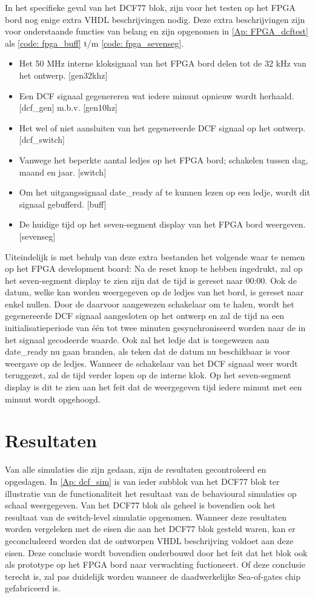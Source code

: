 \noindent In het specifieke geval van het DCF77 blok, zijn voor het testen op het FPGA bord nog enige extra VHDL beschrijvingen nodig. Deze extra beschrijvingen zijn voor onderstaande functies van belang en zijn opgenomen in \cref{Ap: FPGA_dcftest} als \cref{code: fpga_buff} t/m \cref{code: fpga_sevenseg}.
\begin{itemize}[nolistsep]
\item Het 50 MHz interne kloksignaal van het FPGA bord delen tot de 32 kHz van het ontwerp. [gen32khz]
\item Een DCF signaal gegenereren wat iedere minuut opnieuw wordt herhaald. [dcf\_gen] m.b.v. [gen10hz]
\item Het wel of niet aansluiten van het gegenereerde DCF signaal op het ontwerp. [dcf\_switch]
\item Vanwege het beperkte aantal ledjes op het FPGA bord; schakelen tussen dag, maand en jaar. [switch]
\item Om het uitgangssignaal date\_ready af te kunnen lezen op een ledje, wordt dit signaal gebufferd. [buff]
\item De huidige tijd op het seven-segment display van het FPGA bord weergeven. [sevenseg]\\
\end{itemize}
Uiteindelijk is met behulp van deze extra bestanden het volgende waar te nemen op het FPGA development board: Na de reset knop te hebben ingedrukt, zal op het seven-segment display te zien zijn dat de tijd is gereset naar 00:00. Ook de datum, welke kan worden weergegeven op de ledjes van het bord, is gereset naar enkel nullen. Door de daarvoor aangewezen schakelaar om te halen, wordt het gegenereerde DCF signaal aangesloten op het ontwerp en zal de tijd na een initialisatieperiode van \'e\'en tot twee minuten gesynchroniseerd worden naar de in het signaal gecodeerde waarde. Ook zal het ledje dat is toegewezen aan date\_ready nu gaan branden, als teken dat de datum nu beschikbaar is voor weergave op de ledjes. Wanneer de schakelaar van het DCF signaal weer wordt teruggezet, zal de tijd verder lopen op de interne klok. Op het seven-segment display is dit te zien aan het feit dat de weergegeven tijd iedere minuut met een minuut wordt opgehoogd.

\section{Resultaten}
Van alle simulaties die zijn gedaan, zijn de resultaten gecontroleerd en opgeslagen. In \cref{Ap: dcf_sim} is van ieder subblok van het DCF77 blok ter illustratie van de functionaliteit het resultaat van de behavioural simulaties op schaal weergegeven. Van het DCF77 blok als geheel is bovendien ook het resultaat van de switch-level simulatie opgenomen. Wanneer deze resultaten worden vergeleken met de eisen die aan het DCF77 blok gesteld waren, kan er geconcludeerd worden dat de ontworpen VHDL beschrijving voldoet aan deze eisen. Deze conclusie wordt bovendien onderbouwd door het feit dat het blok ook als prototype op het FPGA bord naar verwachting fuctioneert. Of deze conclusie terecht is, zal pas duidelijk worden wanneer de daadwerkelijke Sea-of-gates chip gefabriceerd is.